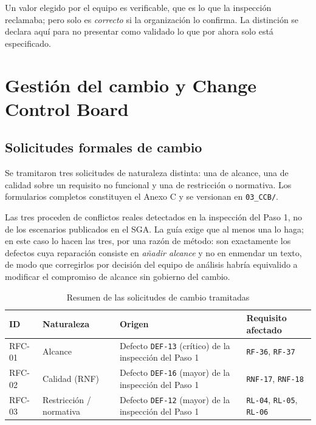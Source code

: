 \documentclass[11pt,letterpaper]{article}
\newcommand{\id}[1]{\texttt{#1}}
\begin{document}
\noindent
Un valor elegido por el equipo es verificable, que es lo que la inspección reclamaba; pero solo es
\emph{correcto} si la organización lo confirma. La distinción se declara aquí para no presentar como
validado lo que por ahora solo está especificado.

\section{Gestión del cambio y Change Control Board}
\label{sec:ccb}

\subsection{Solicitudes formales de cambio}

Se tramitaron tres solicitudes de naturaleza distinta: una de alcance, una de calidad sobre un
requisito no funcional y una de restricción o normativa. Los formularios completos constituyen el
Anexo C y se versionan en \texttt{03\_CCB/}.

Las tres proceden de conflictos reales detectados en la inspección del Paso 1, no de los escenarios
publicados en el SGA. La guía exige que al menos una lo haga; en este caso lo hacen las tres, por una
razón de método: son exactamente los defectos cuya reparación consiste en \emph{añadir alcance} y no
en enmendar un texto, de modo que corregirlos por decisión del equipo de análisis habría equivalido a
modificar el compromiso de alcance sin gobierno del cambio.

\begin{table}[H]
\centering
\caption{Resumen de las solicitudes de cambio tramitadas}
\begin{tabular}{L{1.5cm} L{3cm} L{4.5cm} L{4.5cm}}
\toprule
\textbf{ID} & \textbf{Naturaleza} & \textbf{Origen} & \textbf{Requisito afectado}\\
\midrule
RFC-01 & Alcance & Defecto \texttt{DEF-13} (crítico) de la inspección del Paso 1 & \id{RF-36}, \id{RF-37}\\
RFC-02 & Calidad (RNF) & Defecto \texttt{DEF-16} (mayor) de la inspección del Paso 1 & \id{RNF-17}, \id{RNF-18}\\
RFC-03 & Restricción / normativa & Defecto \texttt{DEF-12} (mayor) de la inspección del Paso 1 & \id{RL-04}, \id{RL-05}, \id{RL-06}\\
\bottomrule
\end{tabular}
\end{table}
\end{document}
